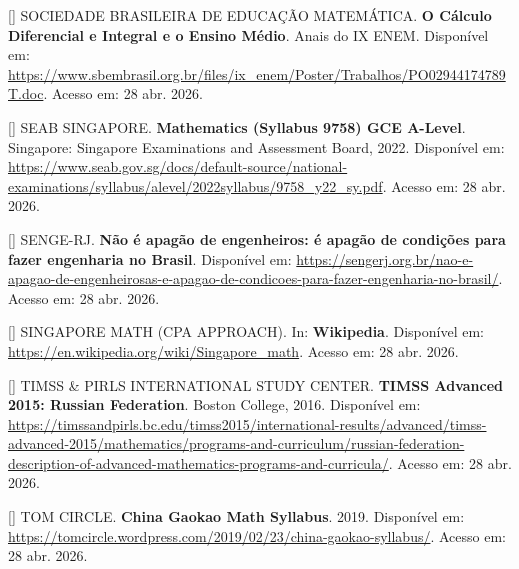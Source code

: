 \documentclass[12pt,a4paper,oneside]{article}
\begin{document}
\begin{singlespace}
\noindent\hangindent=1.25cm
[\theequation\label{ref:sbem-calculo}]
SOCIEDADE BRASILEIRA DE EDUCAÇÃO MATEMÁTICA. \textbf{O Cálculo
Diferencial e Integral e o Ensino Médio}. Anais do IX ENEM.
Disponível em:
\url{https://www.sbembrasil.org.br/files/ix_enem/Poster/Trabalhos/PO02944174789T.doc}.
Acesso em: 28 abr. 2026.\par\smallskip

\noindent\hangindent=1.25cm
[\theequation\label{ref:seab-9758}]
SEAB SINGAPORE. \textbf{Mathematics (Syllabus 9758) \textendash{}
GCE A-Level}. Singapore: Singapore Examinations and Assessment
Board, 2022. Disponível em:
\url{https://www.seab.gov.sg/docs/default-source/national-examinations/syllabus/alevel/2022syllabus/9758_y22_sy.pdf}.
Acesso em: 28 abr. 2026.\par\smallskip

\noindent\hangindent=1.25cm
[\theequation\label{ref:senge-rj}]
SENGE-RJ. \textbf{Não é apagão de engenheiros: é apagão de
condições para fazer engenharia no Brasil}. Disponível em:
\url{https://sengerj.org.br/nao-e-apagao-de-engenheirosas-e-apagao-de-condicoes-para-fazer-engenharia-no-brasil/}.
Acesso em: 28 abr. 2026.\par\smallskip

\noindent\hangindent=1.25cm
[\theequation\label{ref:singapore-math-wiki}]
SINGAPORE MATH (CPA APPROACH). In: \textbf{Wikipedia}. Disponível
em: \url{https://en.wikipedia.org/wiki/Singapore_math}. Acesso em:
28 abr. 2026.\par\smallskip

\noindent\hangindent=1.25cm
[\theequation\label{ref:timss-russia}]
TIMSS \& PIRLS INTERNATIONAL STUDY CENTER. \textbf{TIMSS Advanced
2015: Russian Federation}. Boston College, 2016. Disponível em:
\url{https://timssandpirls.bc.edu/timss2015/international-results/advanced/timss-advanced-2015/mathematics/programs-and-curriculum/russian-federation-description-of-advanced-mathematics-programs-and-curricula/}.
Acesso em: 28 abr. 2026.\par\smallskip

\noindent\hangindent=1.25cm
[\theequation\label{ref:tomcircle-gaokao}]
TOM CIRCLE. \textbf{China Gaokao Math Syllabus}. 2019. Disponível
em:
\url{https://tomcircle.wordpress.com/2019/02/23/china-gaokao-syllabus/}.
Acesso em: 28 abr. 2026.\par\smallskip


\end{singlespace}
\end{document}
